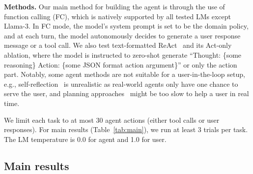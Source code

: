 \documentclass{article}
\begin{document}
\textbf{Methods.} Our main method for building the agent is through the use of  function calling ({FC}), which is natively supported by all tested LMs except Llama-3. In FC mode, the model's system prompt is set to be the domain policy, and at each turn, the model autonomously decides to generate a user response message or a tool call. We also test text-formatted ReAct~\citep{yao2023react} and its Act-only ablation, where the model is instructed to zero-shot generate ``Thought: \{some reasoning\} Action: \{some JSON format action argument\}'' or only the action part. Notably, some agent methods are not suitable for a user-in-the-loop setup, e.g., self-reflection~\cite{shinn2023reflexion} is unrealistic as real-world agents only have one chance to serve the user, and planning approaches~\cite{yao2023tree} might be too slow to help a user in real time.

We limit each task to at most 30 agent actions (either tool calls or user responses). For main results (Table~\ref{tab:main}), we run at least 3 trials per task.
The LM temperature is 0.0 for agent and 1.0 for user. 


\subsection{Main results}
\label{sec:results}
\end{document}

